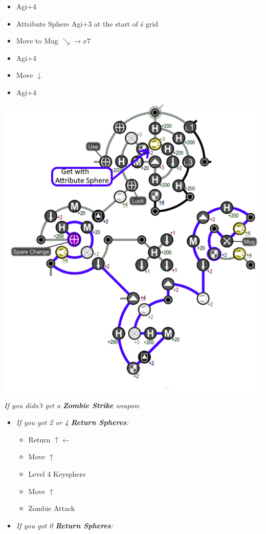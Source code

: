 \begin{spheregrid}
\begin{multicols}{2}
\begin{itemize}
\begin{itemize}
				      \item Agi+4
				      \item Attribute Sphere Agi+3 at the start of \rikku\'s grid
				      \item Move to Mug $\searrow\rightarrow x7$
				      \item Agi+4
				      \item Move $\downarrow$
				      \item Agi+4
			      \end{itemize}
			      \includegraphics[width=.8\columnwidth]{graphics/0_return_before_BFA}
				  \columnbreak
			      \tidusf \textit{If you didn't get a \textbf{Zombie Strike} weapon}:
			      \begin{itemize}
				      \item \textit{If you got 2 or 4 \textbf{Return Spheres}:}
				            \begin{itemize}
					            \item Return $\uparrow\leftarrow$
					            \item Move $\uparrow$
					            \item Level 4 Keysphere
					            \item Move $\uparrow$
					            \item Zombie Attack
				            \end{itemize}
				      \item \textit{If you got 0 \textbf{Return Spheres}:}

\end{itemize}
\end{itemize}
\end{multicols}
\end{spheregrid}
